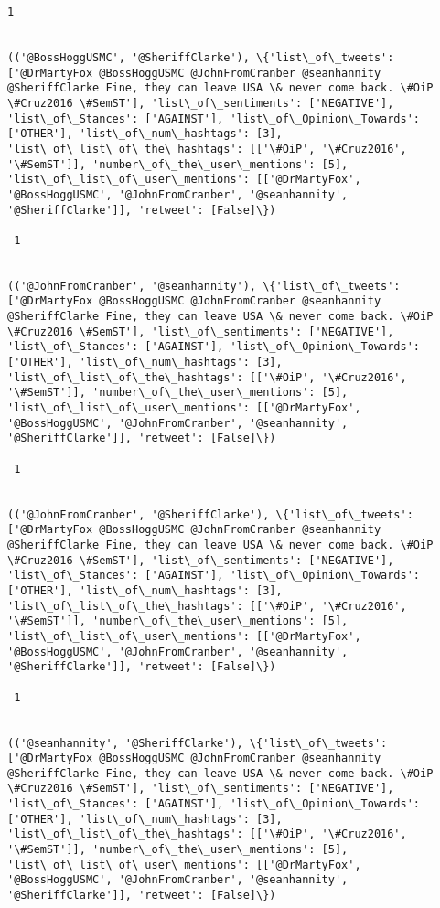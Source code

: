 \documentclass[11pt]{article}
\begin{document}
\begin{Verbatim}[commandchars=\\\{\}]
 1
 

(('@BossHoggUSMC', '@SheriffClarke'), \{'list\_of\_tweets': ['@DrMartyFox @BossHoggUSMC @JohnFromCranber @seanhannity @SheriffClarke Fine, they can leave USA \& never come back. \#OiP \#Cruz2016 \#SemST'], 'list\_of\_sentiments': ['NEGATIVE'], 'list\_of\_Stances': ['AGAINST'], 'list\_of\_Opinion\_Towards': ['OTHER'], 'list\_of\_num\_hashtags': [3], 'list\_of\_list\_of\_the\_hashtags': [['\#OiP', '\#Cruz2016', '\#SemST']], 'number\_of\_the\_user\_mentions': [5], 'list\_of\_list\_of\_user\_mentions': [['@DrMartyFox', '@BossHoggUSMC', '@JohnFromCranber', '@seanhannity', '@SheriffClarke']], 'retweet': [False]\})

 1
 

(('@JohnFromCranber', '@seanhannity'), \{'list\_of\_tweets': ['@DrMartyFox @BossHoggUSMC @JohnFromCranber @seanhannity @SheriffClarke Fine, they can leave USA \& never come back. \#OiP \#Cruz2016 \#SemST'], 'list\_of\_sentiments': ['NEGATIVE'], 'list\_of\_Stances': ['AGAINST'], 'list\_of\_Opinion\_Towards': ['OTHER'], 'list\_of\_num\_hashtags': [3], 'list\_of\_list\_of\_the\_hashtags': [['\#OiP', '\#Cruz2016', '\#SemST']], 'number\_of\_the\_user\_mentions': [5], 'list\_of\_list\_of\_user\_mentions': [['@DrMartyFox', '@BossHoggUSMC', '@JohnFromCranber', '@seanhannity', '@SheriffClarke']], 'retweet': [False]\})

 1
 

(('@JohnFromCranber', '@SheriffClarke'), \{'list\_of\_tweets': ['@DrMartyFox @BossHoggUSMC @JohnFromCranber @seanhannity @SheriffClarke Fine, they can leave USA \& never come back. \#OiP \#Cruz2016 \#SemST'], 'list\_of\_sentiments': ['NEGATIVE'], 'list\_of\_Stances': ['AGAINST'], 'list\_of\_Opinion\_Towards': ['OTHER'], 'list\_of\_num\_hashtags': [3], 'list\_of\_list\_of\_the\_hashtags': [['\#OiP', '\#Cruz2016', '\#SemST']], 'number\_of\_the\_user\_mentions': [5], 'list\_of\_list\_of\_user\_mentions': [['@DrMartyFox', '@BossHoggUSMC', '@JohnFromCranber', '@seanhannity', '@SheriffClarke']], 'retweet': [False]\})

 1
 

(('@seanhannity', '@SheriffClarke'), \{'list\_of\_tweets': ['@DrMartyFox @BossHoggUSMC @JohnFromCranber @seanhannity @SheriffClarke Fine, they can leave USA \& never come back. \#OiP \#Cruz2016 \#SemST'], 'list\_of\_sentiments': ['NEGATIVE'], 'list\_of\_Stances': ['AGAINST'], 'list\_of\_Opinion\_Towards': ['OTHER'], 'list\_of\_num\_hashtags': [3], 'list\_of\_list\_of\_the\_hashtags': [['\#OiP', '\#Cruz2016', '\#SemST']], 'number\_of\_the\_user\_mentions': [5], 'list\_of\_list\_of\_user\_mentions': [['@DrMartyFox', '@BossHoggUSMC', '@JohnFromCranber', '@seanhannity', '@SheriffClarke']], 'retweet': [False]\})


\end{Verbatim}
\end{document}
